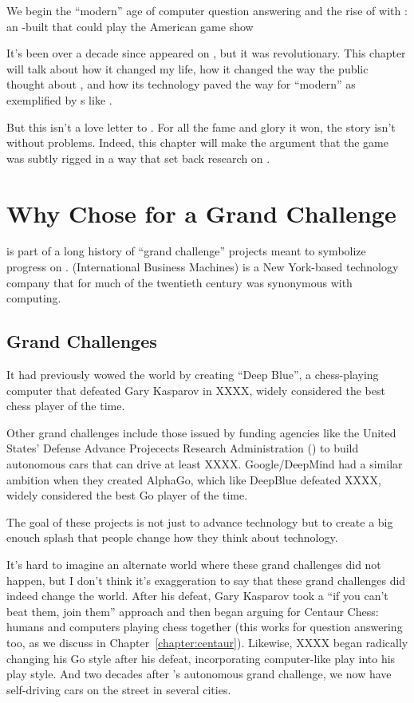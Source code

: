 
We begin the ``modern'' age of computer question answering and the rise of
 with \watson{}: an -built  that could play the
American game show \jeopardyf{}

It's been over a decade since \watson{} appeared on , but it was
revolutionary.  This chapter will talk about how it changed my life, how it
changed the way the public thought about , and how its technology
paved the way for ``modern''  as exemplified by \mm{}s like .

But this isn't a love letter to \watson{}.  For all the fame and glory it won, the
\watson{} story isn't without problems.  Indeed, this chapter will make the
argument that the game was subtly rigged in a way that set back research on
.

\section{Why  Chose \jeopardy{} for a Grand Challenge}

\watson{} is part of a long history of ``grand challenge'' projects meant to
symbolize progress on .
%
 (International Business Machines) is a New York-based technology
company that for much of the twentieth century was synonymous with computing.

\subsection{Grand Challenges}
\label{sec:grand-challenge}

It had previously wowed the world by creating ``Deep Blue'', a chess-playing
computer that defeated Gary Kasparov in XXXX, widely considered the best chess
player of the time.
%

Other  grand challenges include those issued by funding agencies like
the United States' Defense Advance Projecects Research Administration
() to build autonomous cars that can drive at least XXXX.
%
Google/DeepMind had a similar ambition when they created AlphaGo, which like
DeepBlue defeated XXXX, widely considered the best Go player of the time.

The goal of these projects is not just to advance technology but to create a
big enouch splash that people change how they think about technology.

It's hard to imagine an alternate world where these grand challenges did not
happen, but I don't think it's exaggeration to say that these grand challenges
did indeed change the world.  
%
After his defeat, Gary Kasparov took a ``if you can't beat them, join them''
approach and then began arguing for Centaur Chess: humans and computers
playing chess together (this works for question answering too, as we discuss
in Chapter~\ref{chapter:centaur}).
%
Likewise, XXXX began radically changing his Go style after his defeat,
incorporating computer-like play into his play style.
%
And two decades after 's autonomous grand challenge, we now have
self-driving cars on the street in several  cities.

